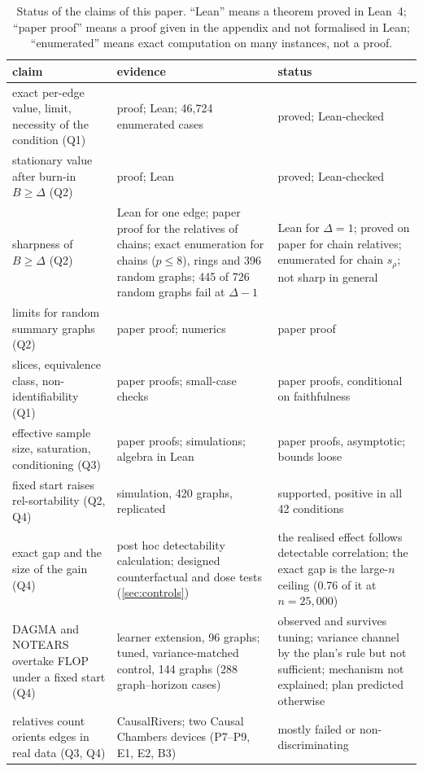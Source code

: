 \documentclass[pdflatex,sn-apa]{sn-jnl}
\theoremstyle{thmstyleone}
\theoremstyle{thmstylethree}
\theoremstyle{thmstyletwo}
\newcommand{\srho}{s_\rho}
\begin{document}
\begin{table}[t]
\caption{Status of the claims of this paper. ``Lean'' means a theorem proved
in Lean~4; ``paper proof'' means a proof given in the appendix and not
formalised in Lean; ``enumerated'' means exact computation on many
instances, not a proof.}
\label{tab:status}
\centering\small
\setlength{\tabcolsep}{3pt}
\begin{tabular}{>{\raggedright\arraybackslash}p{}>{\raggedright\arraybackslash}p{}>{\raggedright\arraybackslash}p{}}
\toprule
claim & evidence & status \\
\midrule
exact per-edge value, limit, necessity of the condition (Q1) & proof; Lean; 46{,}724 enumerated cases & proved; Lean-checked \\
stationary value after burn-in $B\ge\Delta$ (Q2) & proof; Lean & proved; Lean-checked \\
sharpness of $B\ge\Delta$ (Q2) & Lean for one edge; paper proof for the relatives of chains; exact enumeration for chains ($p\le8$), rings and 396 random graphs; 445 of 726 random graphs fail at $\Delta-1$ & Lean for $\Delta=1$; proved on paper for chain relatives; enumerated for chain $\srho$; not sharp in general \\
limits for random summary graphs (Q2) & paper proof; numerics & paper proof \\
slices, equivalence class, non-identifiability (Q1) & paper proofs; small-case checks & paper proofs, conditional on faithfulness \\
effective sample size, saturation, conditioning (Q3) & paper proofs; simulations; algebra in Lean & paper proofs, asymptotic; bounds loose \\
fixed start raises rel-sortability (Q2, Q4) & simulation, 420 graphs, replicated & supported, positive in all 42 conditions \\
exact gap and the size of the gain (Q4) & post hoc detectability calculation; designed counterfactual and dose tests (\cref{sec:controls}) & the realised effect follows detectable correlation; the exact gap is the large-$n$ ceiling (0.76 of it at $n=25{,}000$) \\
DAGMA and NOTEARS overtake FLOP under a fixed start (Q4) & learner extension, 96 graphs; tuned, variance-matched control, 144 graphs (288 graph--horizon cases) & observed and survives tuning; variance channel by the plan's rule but not sufficient; mechanism not explained; plan predicted otherwise \\
relatives count orients edges in real data (Q3, Q4) & CausalRivers; two Causal Chambers devices (P7--P9, E1, E2, B3) & mostly failed or non-discriminating \\
\bottomrule
\end{tabular}
\end{table}
\end{document}
